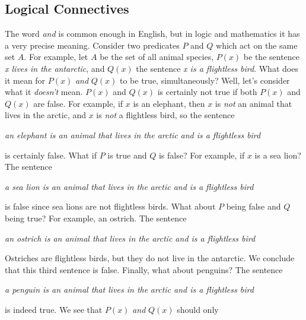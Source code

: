         \subsection{Logical Connectives}
            The word \textit{and} is common enough in English, but in logic and
            mathematics it has a very precise meaning. Consider two predicates
            $P$ and $Q$ which act on the same set $A$. For example, let $A$ be
            the set of all animal species, $P(x)$ be the sentence
            \textit{x lives in the antarctic}, and $Q(x)$ the sentence
            \textit{x is a flightless bird}. What does it mean for
            $P(x)$ \textit{and} $Q(x)$ to be true, simultaneously? Well, let's
            consider what it \textit{doesn't} mean. $P(x)$ and $Q(x)$ is
            certainly not true if both $P(x)$ and $Q(x)$ are false. For example,
            if $x$ is an elephant, then $x$ is \textit{not} an animal that lives
            in the arctic, and $x$ is \textit{not} a flightless bird, so the
            sentence
            \begin{center}
                \textit{an elephant is an animal that lives in the arctic}
                \textit{and is a flightless bird}
            \end{center}is certainly false. What if $P$ is true and $Q$ is
            false? For example, if $x$ is a sea lion?
            The sentence
            \begin{center}
                \textit{a sea lion is an animal that lives in the}
                \textit{arctic and is a flightless bird}
            \end{center}
            is false since sea lions are not flightless birds. What about
            $P$ being false and $Q$ being true? For example, an ostrich.
            The sentence
            \begin{center}
                \textit{an ostrich is an animal that lives in the}
                \textit{arctic and is a flightless bird}
            \end{center}
            Ostriches are flightless birds, but they do not live in the
            antarctic. We conclude that this third sentence is false. Finally,
            what about penguins? The sentence
            \begin{center}
                \textit{a penguin is an animal that lives in the}
                \textit{arctic and is a flightless bird}
            \end{center}
            is indeed true. We see that $P(x)$ \textit{and} $Q(x)$ should only
